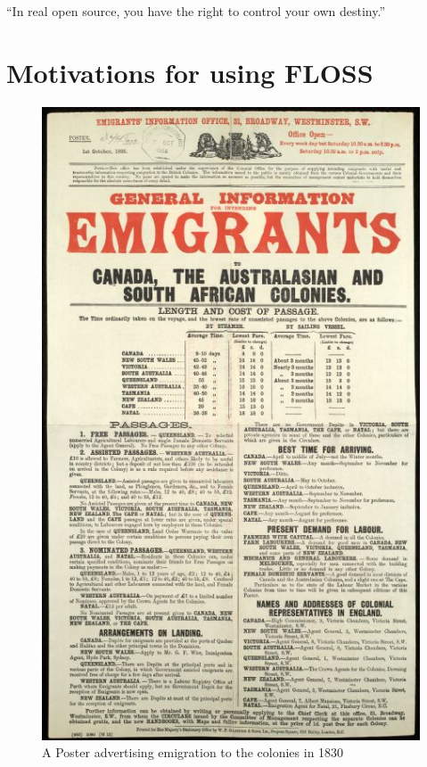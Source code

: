 \newpage
\begin{savequote}[108mm]
``In real open source, you have the right to control your own destiny.''
\end{savequote}
\chapter{Motivations for using FLOSS}
\label{chap:Motivations}
\vspace{-2cm}

    \begin{figure}

     \includegraphics[scale=1.8]{img/Canadaemigration.png}
   \caption  [A Poster advertising emigration to the colonies in 1830]{ {A Poster advertising emigration to the colonies in 1830 \protect\footnotemark} } 
   \end{figure} 
   
